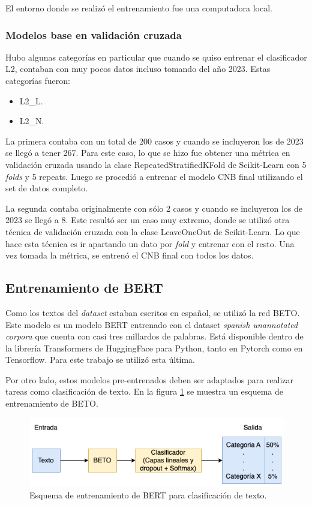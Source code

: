 El entorno donde se realizó el entrenamiento fue una computadora local.

\subsubsection{Modelos base en validación cruzada}

Hubo algunas categorías en particular que cuando se quiso entrenar el clasificador L2, contaban con muy pocos datos incluso tomando del año 2023. Estas categorías fueron:
\begin{itemize}
	\item L2\_L.
	\item L2\_N.
\end{itemize}

La primera contaba con un total de 200 casos y cuando se incluyeron los de 2023  se llegó a tener 267. Para este caso, lo que se hizo fue obtener una métrica en validación cruzada usando la clase RepeatedStratifiedKFold de Scikit-Learn con 5 \textit{folds} y 5 repeats. Luego se procedió a entrenar el modelo CNB final utilizando el set de datos completo.

La segunda contaba originalmente con sólo 2 casos y cuando se incluyeron los de 2023 se llegó a 8. Este resultó ser un caso muy extremo, donde se utilizó otra técnica de validación cruzada con la clase LeaveOneOut de Scikit-Learn. Lo que hace esta técnica es ir apartando un dato por \textit{fold} y entrenar con el resto. Una vez tomada la métrica, se entrenó el CNB final con todos los datos.

\subsection{Entrenamiento de BERT}

Como los textos del \textit{dataset} estaban escritos en español, se utilizó la red BETO. Este modelo es un modelo BERT entrenado con el dataset \textit{spanish unannotated corpora} que cuenta con casi tres millardos de palabras. Está disponible dentro de la librería Transformers de HuggingFace para Python, tanto en Pytorch como en Tensorflow. Para este trabajo se utilizó esta última.

Por otro lado, estos modelos pre-entrenados deben ser adaptados para realizar tareas como clasificación de texto. En la figura \ref{fig:cap3-downstream} se muestra un esquema de entrenamiento de BETO.

\begin{figure}[htbp]
	\centering
	\includegraphics[width=.9\textwidth]{./Figures/cap3-downstream.png}
	\caption{Esquema de entrenamiento de BERT para clasificación de texto.}
	\label{fig:cap3-downstream}
\end{figure}

